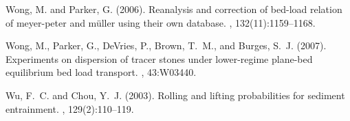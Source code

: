 \documentclass[11pt]{article}
\begin{document}
\begin{thebibliography}{3}

Wong, M. and Parker, G. (2006).
\newblock Reanalysis and correction of bed-load relation of meyer-peter and
  m{\"u}ller using their own database.
, 132(11):1159--1168.

Wong, M., Parker, G., DeVries, P., Brown, T.~M., and Burges, S.~J. (2007).
\newblock Experiments on dispersion of tracer stones under lower-regime
  plane-bed equilibrium bed load transport.
, 43:W03440.

Wu, F.~C. and Chou, Y.~J. (2003).
\newblock Rolling and lifting probabilities for sediment entrainment.
, 129(2):110--119.

%
%
%
%


\end{thebibliography}
\end{document}
